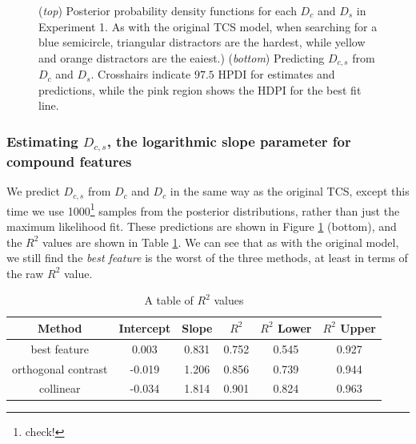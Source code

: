 \documentclass[smallextended, natbib]{svjour3}       %
\begin{document}
\begin{figure}
\centering
{}
\caption{(\textit{top}) Posterior probability density functions for each $D_c$ and $D_s$ in Experiment 1. As with the original TCS model, when searching for a blue semicircle, triangular distractors are the hardest, while yellow and orange distractors are the eaiest.) (\textit{bottom}) Predicting $D_{c,s}$ from $D_c$ and $D_s$. Crosshairs indicate $97.5$ HPDI for estimates and predictions, while the pink region shows the HDPI for the best fit line. }
\label{fig:buetti2019_D}
\end{figure}

\subsubsection{Estimating $D_{c,s}$, the logarithmic slope parameter for compound features}

We predict $D_{c,s}$ from $D_c$ and $D_c$ in the same way as the original TCS, except this time we use 1000\footnote{check!} samples from the posterior distributions, rather than just the maximum likelihood fit. These predictions are shown in Figure \ref{fig:buetti2019_D} (bottom), and the $R^2$ values are shown in Table \ref{tab:reimp_D_r2}. We can see that as with the original model, we still find the \textit{best feature} is the worst of the three methods, at least in terms of the raw $R^2$ value.

\begin{table}[h]
\centering
\begin{tabular}{ c|c|c|c|c|c } 
Method & Intercept & Slope & $R^2$ & $R^2$ Lower & $R^2$ Upper \\
 \hline 
best feature & 0.003 & 0.831 & 0.752 & 0.545 & 0.927\\ 
 orthogonal contrast & -0.019 & 1.206 & 0.856 & 0.739 & 0.944\\ 
 collinear & -0.034 & 1.814	& 0.901 & 0.824 & 0.963\\
\end{tabular}
\caption{A table of $R^2$ values}
\label{tab:reimp_D_r2}
\end{table}
\end{document}
